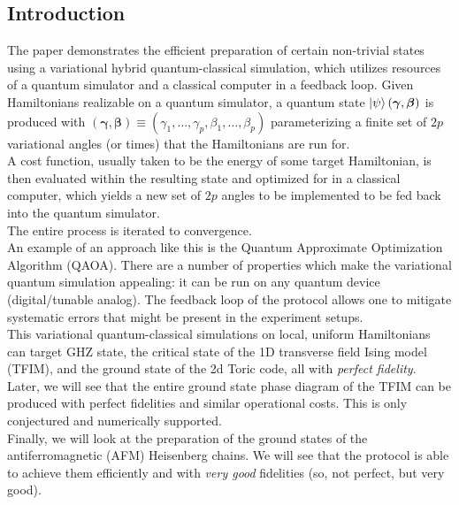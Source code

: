 \documentclass{book}
\theoremstyle{definition}
\begin{document}
\subsection{Introduction}



The paper demonstrates the efficient preparation of certain non-trivial states using a variational hybrid quantum-classical simulation, which utilizes resources of a quantum simulator and a classical computer in a feedback loop. Given Hamiltonians realizable on a quantum simulator, a quantum state $\ket{\psi}(\bm{\gamma}, \bm{\beta})$ is produced with $(\bm{\gamma}, \bm\beta) \equiv (\gamma_1,\dots,\gamma_p, \beta_1,\dots,\beta_p)$ parameterizing a finite set of $2p$ variational angles (or times) that the Hamiltonians are run for. \\

A cost function, usually taken to be the energy of some target Hamiltonian, is then evaluated within the resulting state and optimized for in a classical computer, which yields a new set of $2p$ angles to be implemented to be fed back into the quantum simulator. \\

The entire process is iterated to convergence. \\


An example of an approach like this is the Quantum Approximate Optimization Algorithm (QAOA). There are a number of properties which make the variational quantum simulation appealing: it can be run on any quantum device (digital/tunable analog). The feedback loop of the protocol allows one to mitigate systematic errors that might be present in the experiment setups. \\

This variational quantum-classical simulations on local, uniform Hamiltonians can target GHZ state, the critical state of the 1D transverse field Ising model (TFIM), and the ground state of the 2d Toric code, all with \textit{perfect fidelity}. \\

Later, we will see that the entire ground state phase diagram of the TFIM can be produced with perfect fidelities and similar operational costs. This is only conjectured and numerically supported. \\

Finally, we will look at the preparation of the ground states of the antiferromagnetic (AFM) Heisenberg chains. We will see that the protocol is able to achieve them efficiently and with \textit{very good} fidelities (so, not perfect, but very good).
\end{document}
